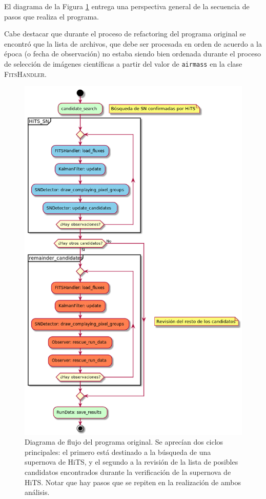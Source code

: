 El diagrama de la Figura \ref{fig:des_sif} entrega una perspectiva general de la secuencia de pasos que realiza el programa.
\bigskip

Cabe destacar que durante el proceso de refactoring del programa original se encontr\'o que la lista de archivos, que debe ser procesada en orden de acuerdo a la \'epoca (o fecha de observaci\'on) no estaba siendo bien ordenada durante el proceso de selecci\'on de im\'agenes cient\'ificas a partir del valor de \texttt{airmass} en la clase \textsc{FitsHandler}.
\bigskip


\begin{figure}[h!]
\centering
\includegraphics[scale=.5]{images/results/sif_act}
\caption{Diagrama de flujo del programa original. Se aprec\'ian dos ciclos principales: el primero est\'a destinado a la b\'usqueda de una supernova de HiTS, y el segundo a la revisi\'on de la lista de posibles candidatos encontrados durante la verificaci\'on de la supernova de HiTS. Notar que hay pasos que se repiten en la realizaci\'on de ambos an\'alisis.}
\label{fig:des_sif}
\end{figure}

